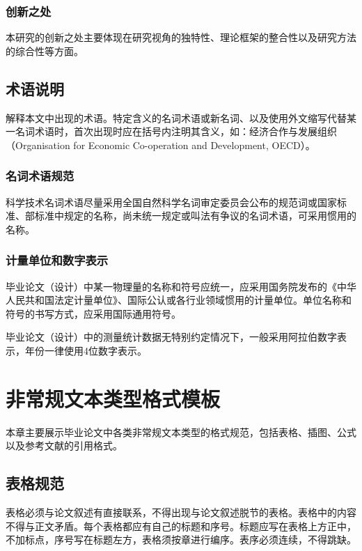 \documentclass[numbering=arabic,fontset=auto]{jnuthesis}
\begin{document}
\subsection{创新之处}

本研究的创新之处主要体现在研究视角的独特性、理论框架的整合性以及研究方法的综合性等方面。

\section{术语说明}

解释本文中出现的术语。特定含义的名词术语或新名词、以及使用外文缩写代替某一名词术语时，首次出现时应在括号内注明其含义，如：经济合作与发展组织（Organisation for Economic Co-operation and Development, OECD）。

\subsection{名词术语规范}

科学技术名词术语尽量采用全国自然科学名词审定委员会公布的规范词或国家标准、部标准中规定的名称，尚未统一规定或叫法有争议的名词术语，可采用惯用的名称。

\subsection{计量单位和数字表示}

毕业论文（设计）中某一物理量的名称和符号应统一，应采用国务院发布的《中华人民共和国法定计量单位》、国际公认或各行业领域惯用的计量单位。单位名称和符号的书写方式，应采用国际通用符号。

毕业论文（设计）中的测量统计数据无特别约定情况下，一般采用阿拉伯数字表示，年份一律使用4位数字表示。

\chapter{非常规文本类型格式模板}

本章主要展示毕业论文中各类非常规文本类型的格式规范，包括表格、插图、公式以及参考文献的引用格式。

\section{表格规范}

表格必须与论文叙述有直接联系，不得出现与论文叙述脱节的表格。表格中的内容不得与正文矛盾。每个表格都应有自己的标题和序号。标题应写在表格上方正中，不加标点，序号写在标题左方，表格须按章进行编序。表序必须连续，不得跳缺。
\end{document}
